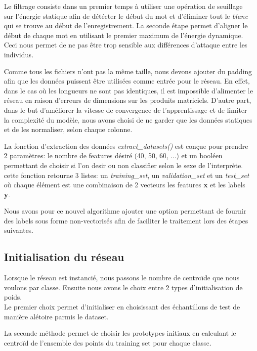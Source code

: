 \documentclass[11pt]{article}
\begin{document}
Le filtrage consiste dans un premier temps \`a utiliser une op\'eration de
seuillage sur l'\'energie statique afin de d\'et\'ecter le d\'ebut du mot et
d'\'eliminer tout le {\em blanc} qui se trouve au d\'ebut de l'enregistrement.
La seconde \'etape permet d'aligner le d\'ebut de chaque mot en utilisant le
premier maximum de l'\'energie dynamique.
Ceci nous permet de ne pas \^etre trop sensible aux diff\'erences d'attaque
entre les individus.

Comme tous les fichiers n'ont pas la m\^eme taille, nous devons ajouter
du padding afin que les donn\'ees puissent \^etre utilis\'ees comme
entr\'ee pour le r\'eseau. En effet, dans le cas o\`u les longueurs ne sont pas
identiques, il est impossible d'alimenter le r\'eseau en raison d'erreurs
de dimensions sur les produits matriciels.
D'autre part, dans le but d'am\'eliorer la vitesse de convergence de
l'apprentissage et de limiter la complexit\'e du mod\`ele, nous avons choisi de
ne garder que les donn\'ees statiques et de les normaliser, selon chaque colonne.

La fonction d'extraction des donn\'ees {\em extract\_datasets()}
est con\c{c}ue pour prendre 2 param\`etres: le nombre de features d\'esir\'e
(40, 50, 60, ...) et un bool\'een permettant de choisir si l'on desir ou non
classifier selon le sexe de l'interpr\`ete. cette fonction retourne 3 listes:
un {\em training\_set}, un {\em validation\_set} et un {\em test\_set} o\`u
chaque \'el\'ement est une combinaison de 2 vecteurs les features {\bf x} et
les labels {\bf y}.

Nous avons pour ce nouvel algorithme ajouter une option permettant de fournir
des labels sous forme non-vectoris\'es afin de faciliter le traitement lors des
\'etapes suivantes.



\subsection{Initialisation du r\'eseau}
Lorsque le r\'eseau est instanci\'e, nous passons le nombre de centro{\"i}de que
nous voulons par classe.
Ensuite nous avons le choix entre 2 types d'initialisation de poids.\\
Le premier choix permet d'initialiser en choisissant des \'echantillons de test
de mani\`ere al\'etoire parmis le dataset.

La seconde m\'ethode permet de choisir les prototypes initiaux en calculant le
centro\"id de l'ensemble des points du training set pour chaque classe.
\end{document}
